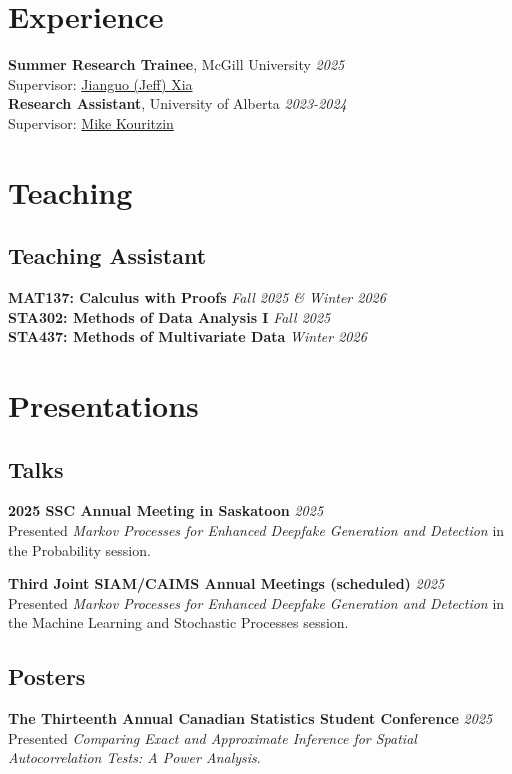 \documentclass[11pt]{article}
\theoremstyle{definition}
\newcommand{\1}{\mathds 1}
\begin{document}
\section*{Experience}
\textbf{Summer Research Trainee}, McGill University \hfill \textit{2025}\\
\indent\hspace{0.2cm} Supervisor: \href{https://www.xialab.ca/}{Jianguo (Jeff) Xia}\\
\textbf{Research Assistant}, University of Alberta \hfill \textit{2023-2024}\\
\indent\hspace{0.2cm} Supervisor: \href{https://www.math.ualberta.ca/~mkouritz/Kouritzin_M.html}{Mike Kouritzin}

\section*{Teaching}
\subsection*{Teaching Assistant}
\textbf{MAT137: Calculus with Proofs} \hfill \textit{Fall 2025 \& Winter 2026}\\
\textbf{STA302: Methods of Data Analysis I} \hfill \textit{Fall 2025}\\
\textbf{STA437: Methods of Multivariate Data} \hfill \textit{Winter 2026}   

\section*{Presentations}
\subsection*{Talks}
\textbf{2025 SSC Annual Meeting in Saskatoon} \hfill \textit{2025}\\
Presented \textit{Markov Processes for Enhanced Deepfake Generation and Detection} in the Probability session. 

\textbf{Third Joint SIAM/CAIMS Annual Meetings (scheduled)} \hfill \textit{2025}\\
Presented \textit{Markov Processes for Enhanced Deepfake Generation and Detection} in the Machine Learning and Stochastic Processes session.

\subsection*{Posters}
\textbf{The Thirteenth Annual Canadian Statistics Student Conference} \hfill \textit{2025}\\
Presented \textit{Comparing Exact and Approximate Inference for Spatial Autocorrelation Tests: A Power Analysis}.
\end{document}
